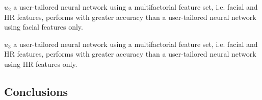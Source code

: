 $u_2$ a user-tailored neural network using a multifactorial feature set, i.e. facial and HR features, performs with greater accuracy than a user-tailored neural network using facial features only.

$u_3$ a user-tailored neural network using a multifactorial feature set, i.e. facial and HR features, performs with greater accuracy than a user-tailored neural network using HR features only.

\subsection{Conclusions}






